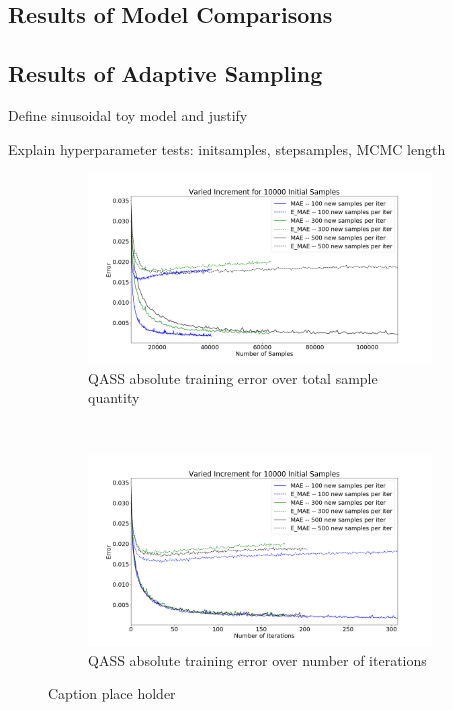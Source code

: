 \subsection{Results of Model Comparisons}
\label{sec:modelres}



\newpage

\subsection{Results of Adaptive Sampling}
\label{sec:adaptiveres}

Define sinusoidal toy model and justify

Explain hyperparameter tests: initsamples, stepsamples, MCMC length

\begin{figure}[h]
    \centering
    \begin{subfigure}[t]{0.5\textwidth}
        \centering
        \includegraphics[width=1.1\linewidth]{fig5_qassincrsamp.png}
        \caption{QASS absolute training error over total sample quantity}
    \end{subfigure}%
    ~ 
    \begin{subfigure}[t]{0.5\textwidth}
        \centering
        \includegraphics[width=1.1\linewidth]{fig6_qassincrtime.png}
        \caption{QASS absolute training error over number of iterations}
    \end{subfigure}
    \caption{Caption place holder}
\end{figure}

